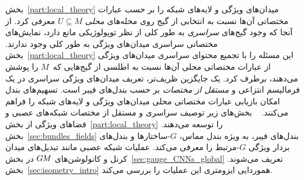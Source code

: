 \label{part:bundle_theory}
بخش~\ref{part:local_theory} میدان‌های ویژگی و لایه‌های شبکه را بر حسب عبارات مختصاتی آن‌ها نسبت به انتخابی از گیج روی محله‌های \emph{محلی} $U\subseteq M$ معرفی کرد.
از آنجا که وجود گیج‌های \emph{سراسری} به طور کلی از نظر توپولوژیکی مانع دارد، نمایش‌های مختصاتی سراسری میدان‌های ویژگی به طور کلی وجود ندارند.
بخش~\ref{part:local_theory} این مسئله را با تجمیع محتوای سراسری میدان‌های ویژگی از عبارات مختصاتی محلی آن‌ها نسبت به اطلسی از گیج‌هایی که~$M$ را پوشش می‌دهند، برطرف کرد.
یک جایگزین ظریف‌تر، تعریف میدان‌های ویژگی سراسری در یک فرمالیسم انتزاعی و \emph{مستقل از مختصات} بر حسب بندل‌های فیبر است.
تسهیم‌های بندل امکان بازیابی عبارات مختصاتی محلی میدان‌های ویژگی و لایه‌های شبکه را فراهم می‌کنند.
\etocsettocstyle{}{} %
\localtableofcontents
~
بخش‌های زیر توصیف سراسری و مستقل از مختصات شبکه‌های عصبی و فضاهای ویژگی از بخش~\ref{part:local_theory} را توسعه می‌دهند.
بخش~\ref{sec:bundles_fields} بندل‌های فیبر، به ویژه بندل مماس، $G$-ساختارها و بندل‌های بردار ویژگی $G$-مرتبط را معرفی می‌کند.
عملیات شبکه عصبی مانند تبدیل‌های میدان کرنل و کانولوشن‌های $G\mkern-1.4muM$ در بخش~\ref{sec:gauge_CNNs_global} تعریف می‌شوند.
بخش~\ref{sec:isometry_intro} هموردایی ایزومتری این عملیات را بررسی می‌کند.
